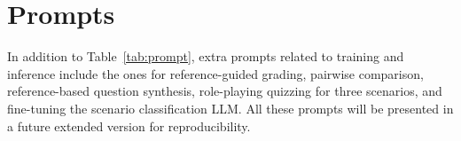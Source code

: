 \section{Prompts}
\label{app:prompts}

In addition to Table~\ref{tab:prompt}, extra prompts related to \modelname training and inference include the ones for reference-guided grading, pairwise comparison, reference-based question synthesis, role-playing quizzing for three scenarios, and fine-tuning the scenario classification LLM. All these prompts will be presented in a future extended version for reproducibility.



